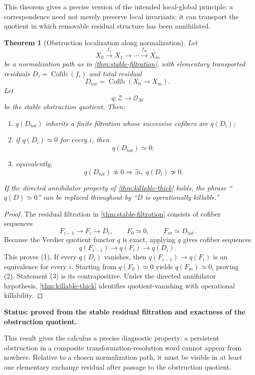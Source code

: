 \documentclass[11pt]{article}
\newtheorem{theorem}{Theorem}[section]
\theoremstyle{definition}
\theoremstyle{remark}
\newcommand{\Cofib}{\operatorname{Cofib}}
\newcommand{\status}[1]{\textbf{Status: #1.}}
\begin{document}
This theorem gives a precise version of the intended local-global principle: a correspondence need not merely preserve local invariants; it can transport the quotient in which removable residual structure has been annihilated.

\begin{theorem}[Obstruction localization along normalization]\label{thm:obstruction-localization}
Let
\[
X_0\xrightarrow{f_1}X_1\xrightarrow{}\cdots\xrightarrow{f_m}X_m
\]
be a normalization path as in \cref{thm:stable-filtration}, with elementary transported residuals $D_i=\Cofib(f_i)$ and total residual
\[
D_{\mathrm{tot}}=\Cofib(X_0\to X_m).
\]
Let
\[
q:\mathcal Z\to\mathcal O_{\mathscr M}
\]
be the stable obstruction quotient. Then:
\begin{enumerate}
    \item $q(D_{\mathrm{tot}})$ inherits a finite filtration whose successive cofibers are $q(D_i)$;
    \item if $q(D_i)\simeq0$ for every $i$, then
    \[
    q(D_{\mathrm{tot}})\simeq0;
    \]
    \item equivalently,
    \[
    q(D_{\mathrm{tot}})\not\simeq0
    \Longrightarrow
    \exists i,\;q(D_i)\not\simeq0.
    \]
\end{enumerate}
If the directed annihilator property of \cref{thm:killable-thick} holds, the phrase ``$q(D)\simeq0$'' can be replaced throughout by ``$D$ is operationally killable.''
\end{theorem}

\begin{proof}
The residual filtration in \cref{thm:stable-filtration} consists of cofiber sequences
\[
F_{i-1}\longrightarrow F_i\longrightarrow D_i,
\qquad
F_0\simeq0,
\qquad
F_m\simeq D_{\mathrm{tot}}.
\]
Because the Verdier quotient functor $q$ is exact, applying $q$ gives cofiber sequences
\[
q(F_{i-1})\longrightarrow q(F_i)\longrightarrow q(D_i).
\]
This proves (1). If every $q(D_i)$ vanishes, then $q(F_{i-1})\to q(F_i)$ is an equivalence for every $i$. Starting from $q(F_0)\simeq0$ yields $q(F_m)\simeq0$, proving (2). Statement (3) is its contrapositive. Under the directed annihilator hypothesis, \cref{thm:killable-thick} identifies quotient-vanishing with operational killability.
\end{proof}

\status{proved from the stable residual filtration and exactness of the obstruction quotient}

This result gives the calculus a precise diagnostic property: a persistent obstruction in a composite transformation-resolution word cannot appear from nowhere. Relative to a chosen normalization path, it must be visible in at least one elementary exchange residual after passage to the obstruction quotient.
\end{document}

